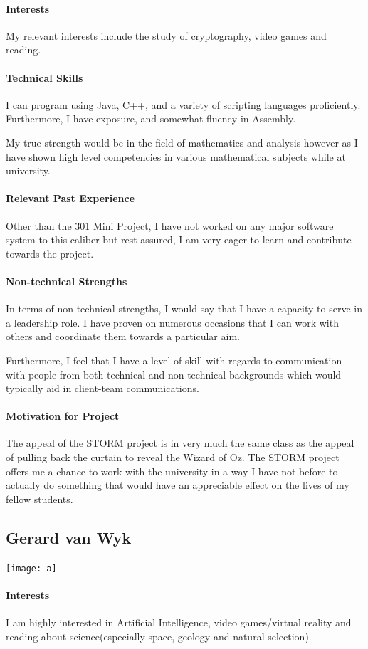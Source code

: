 \documentclass[12pt]{article}
\begin{document}
\paragraph{Interests}
My relevant interests include the study of cryptography, video games and reading.
\paragraph{Technical Skills}
I can program using Java, C++, and a variety of scripting languages proficiently.
Furthermore, I have exposure, and somewhat fluency in Assembly.

My true strength would be in the field of mathematics and analysis however as I have shown high level competencies in various mathematical subjects while at university.
\paragraph{Relevant Past Experience}
Other than the 301 Mini Project, I have not worked on any major software system to this caliber but rest assured, I am very eager to learn and contribute towards the project.
\paragraph{Non-technical Strengths}
In terms of non-technical strengths, I would say that I have a capacity to serve in a leadership role. I have proven on numerous occasions that I can work with others and coordinate them towards a particular aim.

Furthermore, I feel that I have a level of skill with regards to communication with people from both technical and non-technical backgrounds which would typically aid in client-team communications.
\paragraph{Motivation for Project}
The appeal of the STORM project is in very much the same class as the appeal of pulling back the curtain to reveal the Wizard of Oz. The STORM project offers me a chance to work with the university in a way I have not before to actually do something that would have an appreciable effect on the lives of my fellow students.

\subsection{Gerard van Wyk}
\texttt{[image: a]}
\paragraph{Interests}
I am highly interested in Artificial Intelligence, video games/virtual reality and reading about science(especially space, geology and natural selection).
\end{document}
